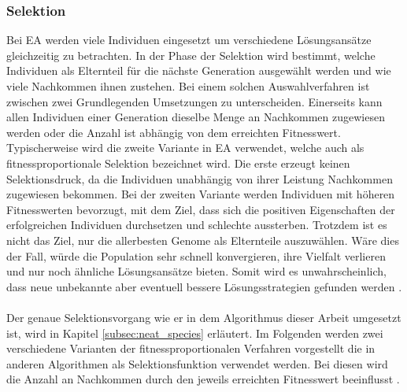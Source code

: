 \subsubsection{Selektion}
Bei \ac{EA} werden viele Individuen eingesetzt um verschiedene Lösungsansätze gleichzeitig zu betrachten. In der Phase der Selektion wird bestimmt, welche Individuen als Elternteil für die nächste Generation ausgewählt werden und wie viele Nachkommen ihnen zustehen. Bei einem solchen Auswahlverfahren ist zwischen zwei Grundlegenden Umsetzungen zu unterscheiden. Einerseits kann allen Individuen einer Generation dieselbe Menge an Nachkommen zugewiesen werden oder die Anzahl ist abhängig von dem erreichten Fitnesswert. Typischerweise wird die zweite Variante in \ac{EA} verwendet, welche auch als fitnessproportionale Selektion bezeichnet wird. Die erste erzeugt keinen Selektionsdruck, da die Individuen unabhängig von ihrer Leistung Nachkommen zugewiesen bekommen. Bei der zweiten Variante werden Individuen mit höheren Fitnesswerten bevorzugt, mit dem Ziel, dass sich die positiven Eigenschaften der erfolgreichen Individuen durchsetzen und schlechte aussterben. Trotzdem ist es nicht das Ziel, nur die allerbesten Genome als Elternteile auszuwählen. Wäre dies der Fall, würde die Population sehr schnell konvergieren, ihre Vielfalt verlieren und nur noch ähnliche Lösungsansätze bieten. Somit wird es unwahrscheinlich, dass neue unbekannte aber eventuell bessere Lösungsstrategien gefunden werden \cite{weicker2015evolutionare}. 
\\\\
Der genaue Selektionsvorgang wie er in dem Algorithmus dieser Arbeit umgesetzt ist, wird in Kapitel \ref{subsec:neat_species} erläutert. Im Folgenden werden zwei verschiedene Varianten der fitnessproportionalen Verfahren vorgestellt die in anderen Algorithmen als Selektionsfunktion verwendet werden. Bei diesen wird die Anzahl an Nachkommen durch den jeweils erreichten Fitnesswert beeinflusst \cite{weicker2015evolutionare}.

